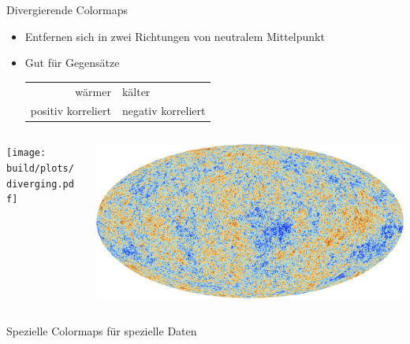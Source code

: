 \documentclass[aspectratio=1610, 9pt]{beamer}
\begin{document}
\begin{frame}[c]{Divergierende Colormaps}
  \begin{itemize}
    \item Entfernen sich in zwei Richtungen von neutralem Mittelpunkt
    \item Gut für Gegensätze \\
        \begin{tabular}{r @{${}⟷  {}$} l}
          wärmer & kälter \\
          positiv korreliert & negativ korreliert \\
        \end{tabular}
  \end{itemize} 

  \vspace{1cm}

  \begin{columns}[c, onlytextwidth]
    \begin{column}{0.4\textwidth}
      \texttt{[image: build/plots/diverging.pdf]}
    \end{column}
    \begin{column}{0.6\textwidth}
      \centering
      \includegraphics[width=\linewidth]{images/Planck_CMB.jpg}
    \end{column}
  \end{columns}
\end{frame}



\begin{frame}{Spezielle Colormaps für spezielle Daten}%
\end{frame}%

\end{document}
